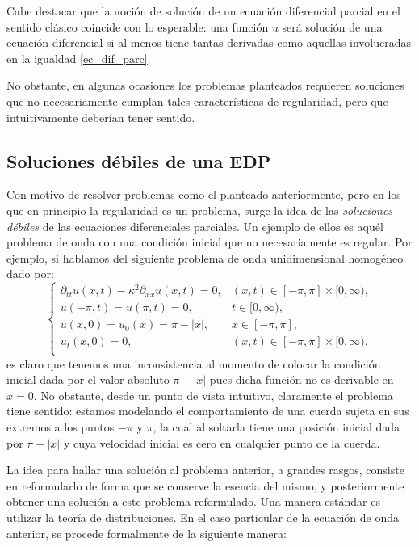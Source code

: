 \documentclass[letterpaper,twoside,12pt]{book}
\newcommand{\1}{\mathds{1}}
\newcommand{\abs}[1]{\left\lvert #1 \right\rvert}
\theoremstyle{definition}
\theoremstyle{definition}
\theoremstyle{remark}
\theoremstyle{definition}
\theoremstyle{definition}
\theoremstyle{definition}
\theoremstyle{definition}
\theoremstyle{definition}
\begin{document}
Cabe destacar que la noción de solución de un ecuación diferencial parcial en el sentido clásico coincide con lo esperable: una función $u$ será solución de una ecuación diferencial si al menos tiene tantas derivadas como aquellas involucradas en la igualdad \eqref{ec_dif_parc}.

No obstante, en algunas ocasiones los problemas planteados requieren soluciones que no necesariamente cumplan tales características de regularidad, pero que intuitivamente deberían tener sentido.

\subsection{Soluciones débiles de una EDP}

Con motivo de resolver problemas como el planteado anteriormente, pero en los que en principio la regularidad es un problema, surge la idea de las \textit{soluciones débiles} de las ecuaciones diferenciales parciales. Un ejemplo de ellos es aquél problema de onda con una condición inicial que no necesariamente es regular. Por ejemplo, si hablamos del siguiente problema de onda unidimensional homogéneo dado por:
\begin{equation}\label{wave_eq_sobolev}
    \begin{cases}
        \partial_{tt}u(x,t)-\kappa^2\partial_{xx}u(x,t)=0, & (x,t)\in [-\pi,\pi]\times[0,\infty),\\
        u(-\pi,t)=u(\pi,t)=0, & t\in [0,\infty),\\
        u(x,0)=u_0(x)=\pi-\abs{x}, & x\in [-\pi,\pi],\\
        u_t(x,0)=0, & (x,t) \in [-\pi,\pi]\times[0,\infty),\\
    \end{cases}
\end{equation}
es claro que tenemos una inconsistencia al momento de colocar la condición inicial dada por el valor absoluto $\pi-|x|$ pues dicha función no es derivable en $x=0$. No obstante, desde un punto de vista intuitivo, claramente el problema tiene sentido: estamos modelando el comportamiento de una cuerda sujeta en sus extremos a los puntos $-\pi$ y $\pi$, la cual al soltarla tiene una posición inicial dada por $\pi-|x|$ y cuya velocidad inicial es cero en cualquier punto de la cuerda.

La idea para hallar una solución al problema anterior, a grandes rasgos, consiste en reformularlo de forma que se conserve la esencia del mismo, y posteriormente obtener una solución a este problema reformulado. Una manera estándar es utilizar la teoría de distribuciones. En el caso particular de la ecuación de onda anterior, se procede formalmente de la siguiente manera:
\end{document}
